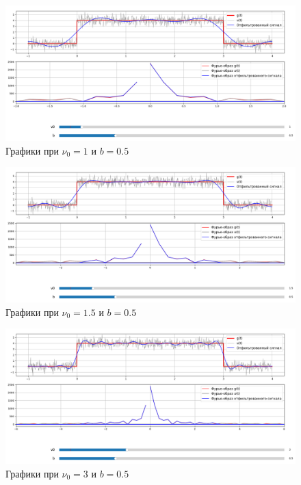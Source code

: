 \documentclass[a4paper,12pt]{article}
\begin{document}
\begin{figure}[H]  
    \centering
    \includegraphics[width=1\textwidth]{../images/1.1_0.5_1.png}
    \caption{Графики при \(\nu_0 = 1\) и \(b = 0.5\)}  
    \label{fig:my_image}  
\end{figure}

\begin{figure}[H]  
    \centering
    \includegraphics[width=1\textwidth]{../images/1.1_0.5_1.5.png}
    \caption{Графики при \(\nu_0 = 1.5\) и \(b = 0.5\)}  
    \label{fig:my_image}  
\end{figure}

\begin{figure}[H]  
    \centering
    \includegraphics[width=1\textwidth]{../images/1.1_0.5_3.png}
    \caption{Графики при \(\nu_0 = 3\) и \(b = 0.5\)}  
    \label{fig:my_image}  
\end{figure}
\end{document}
